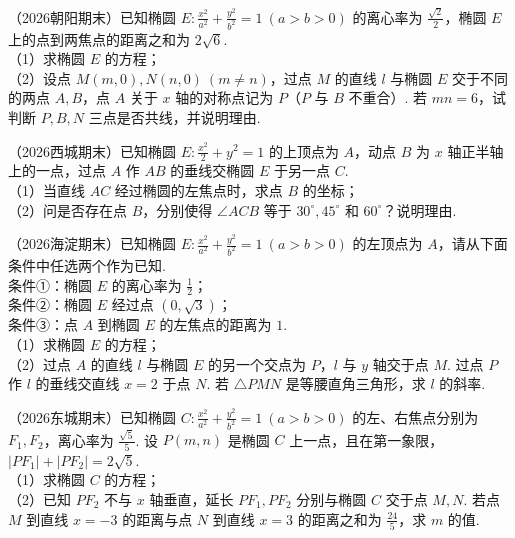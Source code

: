 \begin{example} %
（2026朝阳期末）已知椭圆 $E:\frac{x^2}{a^2}+\frac{y^2}{b^2}=1\ (a>b>0)$ 的离心率为 $\frac{\sqrt{2}}{2}$，椭圆 $E$ 上的点到两焦点的距离之和为 $2\sqrt{6}$.\\
（1）求椭圆 $E$ 的方程；\\
（2）设点 $M(m,0),N(n,0)\ (m\neq n)$，过点 $M$ 的直线 $l$ 与椭圆 $E$ 交于不同的两点 $A,B$，点 $A$ 关于 $x$ 轴的对称点记为 $P$（$P$ 与 $B$ 不重合）. 若 $mn=6$，试判断 $P,B,N$ 三点是否共线，并说明理由.
\end{example}

\begin{example} %
（2026西城期末）已知椭圆 $E:\frac{x^2}{2}+y^2=1$ 的上顶点为 $A$，动点 $B$ 为 $x$ 轴正半轴上的一点，过点 $A$ 作 $AB$ 的垂线交椭圆 $E$ 于另一点 $C$.\\
（1）当直线 $AC$ 经过椭圆的左焦点时，求点 $B$ 的坐标；\\
（2）问是否存在点 $B$，分别使得 $\angle ACB$ 等于 $30^\circ,45^\circ$ 和 $60^\circ$？说明理由.
\end{example}

\begin{example} %
（2026海淀期末）已知椭圆 $E:\frac{x^2}{a^2}+\frac{y^2}{b^2}=1\ (a>b>0)$ 的左顶点为 $A$，请从下面条件中任选两个作为已知.\\
条件①：椭圆 $E$ 的离心率为 $\frac{1}{2}$；\\
条件②：椭圆 $E$ 经过点 $(0,\sqrt{3})$；\\
条件③：点 $A$ 到椭圆 $E$ 的左焦点的距离为 $1$.\\
（1）求椭圆 $E$ 的方程；\\
（2）过点 $A$ 的直线 $l$ 与椭圆 $E$ 的另一个交点为 $P$，$l$ 与 $y$ 轴交于点 $M$. 过点 $P$ 作 $l$ 的垂线交直线 $x=2$ 于点 $N$. 若 $\triangle PMN$ 是等腰直角三角形，求 $l$ 的斜率.
\end{example}

\begin{example} %
（2026东城期末）已知椭圆 $C:\frac{x^2}{a^2}+\frac{y^2}{b^2}=1\ (a>b>0)$ 的左、右焦点分别为 $F_1,F_2$，离心率为 $\frac{\sqrt{5}}{5}$. 设 $P(m,n)$ 是椭圆 $C$ 上一点，且在第一象限，$\lvert PF_1\rvert+\lvert PF_2\rvert=2\sqrt{5}$.\\
（1）求椭圆 $C$ 的方程；\\
（2）已知 $PF_2$ 不与 $x$ 轴垂直，延长 $PF_1,PF_2$ 分别与椭圆 $C$ 交于点 $M,N$. 若点 $M$ 到直线 $x=-3$ 的距离与点 $N$ 到直线 $x=3$ 的距离之和为 $\frac{24}{5}$，求 $m$ 的值.
\end{example}

